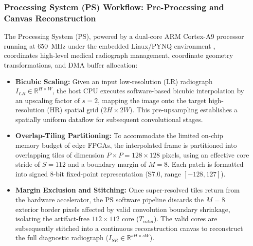 \documentclass[conference]{IEEEtran}
\begin{document}
\subsubsection{Processing System (PS) Workflow: Pre-Processing and Canvas Reconstruction}
The Processing System (PS), powered by a dual-core ARM Cortex-A9 processor running at 650~MHz under the embedded Linux/PYNQ environment \cite{pynqhomepage}, coordinates high-level medical radiograph management, coordinate geometry transformations, and DMA buffer allocation:
\begin{itemize}
    \item \textbf{Bicubic Scaling:} Given an input low-resolution (LR) radiograph $I_{LR} \in \mathbb{R}^{H \times W}$, the host CPU executes software-based bicubic interpolation by an upscaling factor of $s = 2$, mapping the image onto the target high-resolution (HR) spatial grid ($2H \times 2W$). This pre-upsampling establishes a spatially uniform dataflow for subsequent convolutional stages.
    \item \textbf{Overlap-Tiling Partitioning:} To accommodate the limited on-chip memory budget of edge FPGAs, the interpolated frame is partitioned into overlapping tiles of dimension $P \times P = 128 \times 128$ pixels, using an effective core stride of $S = 112$ and a boundary margin of $M = 8$. Each patch is formatted into signed 8-bit fixed-point representation (S7.0, range $[-128, 127]$).
    \item \textbf{Margin Exclusion and Stitching:} Once super-resolved tiles return from the hardware accelerator, the PS software pipeline discards the $M = 8$ exterior border pixels affected by valid convolution boundary shrinkage, isolating the artifact-free $112 \times 112$ core ($T_{valid}$). The valid cores are subsequently stitched into a continuous reconstruction canvas to reconstruct the full diagnostic radiograph ($I_{SR} \in \mathbb{R}^{sH \times sW}$).
\end{itemize}
\end{document}
